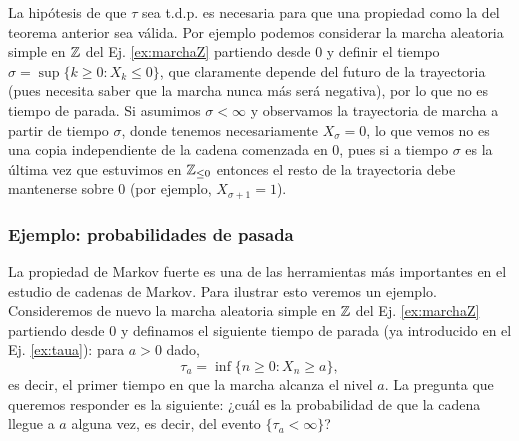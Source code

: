 \begin{ex}
La hipótesis de que $\tau$ sea t.d.p. es necesaria para que una propiedad como la del teorema anterior sea válida.
Por ejemplo podemos considerar la marcha aleatoria simple en $\mathbb{Z}$ del Ej. \ref{ex:marchaZ} partiendo desde $0$ y definir el tiempo $\sigma=\sup\{k\geq0\!:X_k\leq0\}$, que claramente depende del futuro de la trayectoria (pues necesita saber que la marcha nunca más será negativa), por lo que no es tiempo de parada.
Si asumimos $\sigma<\infty$ y observamos la trayectoria de marcha a partir de tiempo $\sigma$, donde tenemos necesariamente $X_\sigma=0$, lo que vemos no es una copia independiente de la cadena comenzada en $0$, pues si a tiempo $\sigma$ es la última vez que estuvimos en $\mathbb{Z}_{\leq0}$ entonces el resto de la trayectoria debe mantenerse sobre $0$ (por ejemplo, $X_{\sigma+1}=1$).
\end{ex}

\subsubsection{Ejemplo: probabilidades de pasada}\label{sec:pasada}

La propiedad de Markov fuerte es una de las herramientas más importantes en el estudio de cadenas de Markov.
Para ilustrar esto veremos un ejemplo.
Consideremos de nuevo la marcha aleatoria simple en $\mathbb{Z}$ del Ej. \ref{ex:marchaZ} partiendo desde $0$ y definamos el siguiente tiempo de parada (ya introducido en el Ej. \ref{ex:taua}): para $a>0$ dado,
\[\tau_{a}=\inf\{n\geq0\!:X_n\geq a\},\]
es decir, el primer tiempo en que la marcha alcanza el nivel $a$.
La pregunta que queremos responder es la siguiente: ¿cuál es la probabilidad de que la cadena llegue a $a$ alguna vez, es decir, del evento $\{\tau_a<\infty\}$?

